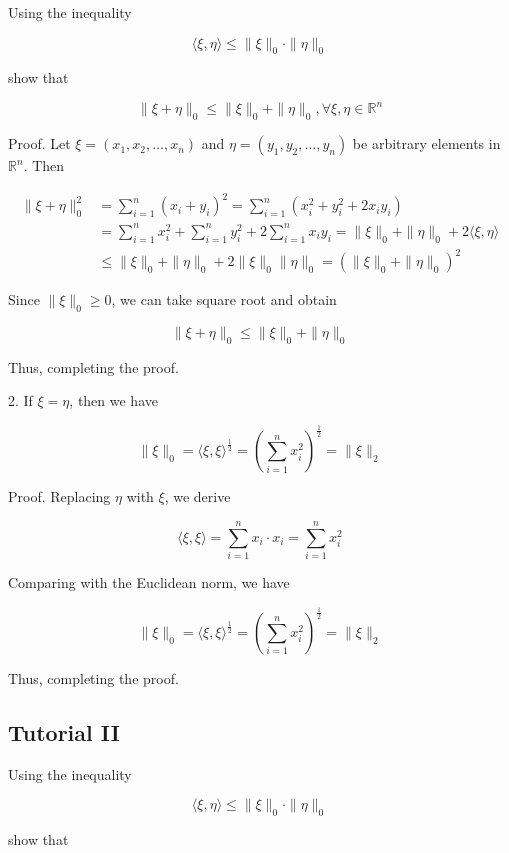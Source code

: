 \documentclass{article}
\begin{document}
Using the inequality

$$
\langle\xi, \eta\rangle \leq\|\xi\|_{0} \cdot\|\eta\|_{0}
$$

show that

$$
\|\xi+\eta\|_{0} \leq\|\xi\|_{0}+\|\eta\|_{0}, \forall \xi, \eta \in \mathbb{R}^{n}
$$

Proof. Let $\xi=\left(x_{1}, x_{2}, \ldots, x_{n}\right)$ and $\eta=\left(y_{1}, y_{2}, \ldots, y_{n}\right)$ be arbitrary elements in $\mathbb{R}^{n}$. Then

$$
\begin{aligned}
\|\xi+\eta\|_{0}^{2} & =\sum_{i=1}^{n}\left(x_{i}+y_{i}\right)^{2}=\sum_{i=1}^{n}\left(x_{i}^{2}+y_{i}^{2}+2 x_{i} y_{i}\right) \\
& =\sum_{i=1}^{n} x_{i}^{2}+\sum_{i=1}^{n} y_{i}^{2}+2 \sum_{i=1}^{n} x_{i} y_{i}=\|\xi\|_{0}+\|\eta\|_{0}+2\langle\xi, \eta\rangle \\
& \leq\|\xi\|_{0}+\|\eta\|_{0}+2\|\xi\|_{0}\|\eta\|_{0}=\left(\|\xi\|_{0}+\|\eta\|_{0}\right)^{2}
\end{aligned}
$$

Since $\|\xi\|_{0} \geq 0$, we can take square root and obtain

$$
\|\xi+\eta\|_{0} \leq\|\xi\|_{0}+\|\eta\|_{0}
$$

Thus, completing the proof.


2. If $\xi=\eta$, then we have

$$
\|\xi\|_{0}=\langle\xi, \xi\rangle^{\frac{1}{2}}=\left(\sum_{i=1}^{n} x_{i}^{2}\right)^{\frac{1}{2}}=\|\xi\|_{2}
$$

Proof. Replacing $\eta$ with $\xi$, we derive

$$
\langle\xi, \xi\rangle=\sum_{i=1}^{n} x_{i} \cdot x_{i}=\sum_{i=1}^{n} x_{i}^{2}
$$

Comparing with the Euclidean norm, we have

$$
\|\xi\|_{0}=\langle\xi, \xi\rangle^{\frac{1}{2}}=\left(\sum_{i=1}^{n} x_{i}^{2}\right)^{\frac{1}{2}}=\|\xi\|_{2}
$$

Thus, completing the proof.

\subsection{Tutorial II}

Using the inequality

$$
\langle\xi, \eta\rangle \leq\|\xi\|_{0} \cdot\|\eta\|_{0}
$$

show that
\end{document}
